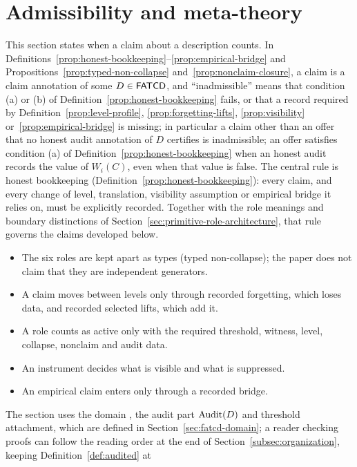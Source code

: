 \section{Admissibility and meta-theory}\label{sec:admissibility-meta-theory}


This section states when a claim about a description counts. In
Definitions~\ref{prop:honest-bookkeeping}--\ref{prop:empirical-bridge} and
Propositions~\ref{prop:typed-non-collapse} and~\ref{prop:nonclaim-closure}, a
claim is a claim annotation of some \(D\in\mathsf{FATCD}{}\), and ``inadmissible''
means that condition (a) or (b) of Definition~\ref{prop:honest-bookkeeping}
fails, or that a record required by Definition~\ref{prop:level-profile},
\ref{prop:forgetting-lifts}, \ref{prop:visibility} or~\ref{prop:empirical-bridge}
is missing; in particular a claim other than an offer that no honest audit annotation of
\(D\) certifies is inadmissible; an offer satisfies condition (a) of Definition~\ref{prop:honest-bookkeeping} when an honest audit
records the value of \(W_i(C)\), even when that value is false. The central
rule is honest bookkeeping (Definition~\ref{prop:honest-bookkeeping}):
every claim, and every change of level, translation, visibility
assumption or empirical bridge it relies on, must be explicitly
recorded. Together with the role meanings and boundary distinctions of
Section~\ref{sec:primitive-role-architecture}, that rule governs the
claims developed below.
\begin{itemize}[topsep=2pt,itemsep=1pt]
  \item The six roles are kept apart as types (typed non-collapse); the
    paper does not claim that they are independent generators.
  \item A claim moves between levels only through recorded forgetting,
    which loses data, and recorded selected lifts, which add it.
  \item A role counts as active only with the required threshold,
    witness, level, collapse, nonclaim and audit data.
  \item An instrument decides what is visible and what is suppressed.
  \item An empirical claim enters only through a recorded bridge.
\end{itemize}
The section uses the domain \FATCD{}, the audit part \(\operatorname{Audit}\!\left(D\right)\) and
threshold attachment, which are defined in
Section~\ref{sec:fatcd-domain}; a reader checking proofs can follow the reading order at the end of
Section~\ref{subsec:organization}, keeping Definition~\ref{def:audited} at

